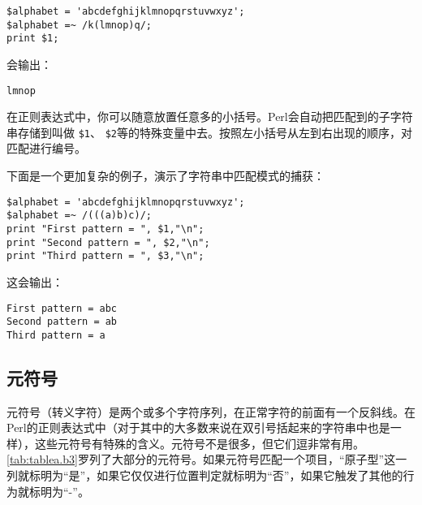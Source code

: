 \begin{lstlisting}
$alphabet = 'abcdefghijklmnopqrstuvwxyz';
$alphabet =~ /k(lmnop)q/;
print $1;
\end{lstlisting}

会输出：

\begin{lstlisting}
lmnop
\end{lstlisting}

在正则表达式中，你可以随意放置任意多的小括号。Perl会自动把匹配到的子字符串存储到叫做 \verb|$1|、 \verb|$2|等的特殊变量中去。按照左小括号从左到右出现的顺序，对匹配进行编号。

下面是一个更加复杂的例子，演示了字符串中匹配模式的捕获：

\begin{lstlisting}
$alphabet = 'abcdefghijklmnopqrstuvwxyz';
$alphabet =~ /(((a)b)c)/;
print "First pattern = ", $1,"\n";
print "Second pattern = ", $2,"\n";
print "Third pattern = ", $3,"\n";
\end{lstlisting}

这会输出：

\begin{lstlisting}
First pattern = abc
Second pattern = ab
Third pattern = a
\end{lstlisting}

\subsection{元符号}
元符号（转义字符）是两个或多个字符序列，在正常字符的前面有一个反斜线。在Perl的正则表达式中（对于其中的大多数来说在双引号括起来的字符串中也是一样），这些元符号有特殊的含义。元符号不是很多，但它们逗非常有用。\autoref{tab:tablea.b3}罗列了大部分的元符号。如果元符号匹配一个项目，“原子型”这一列就标明为“是”，如果它仅仅进行位置判定就标明为“否”，如果它触发了其他的行为就标明为“-”。

